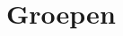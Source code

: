 \documentclass[main.tex]{subfiles}
\begin{document}
\chapter{Groepen}
\label{cha:groepen}
\end{document}
